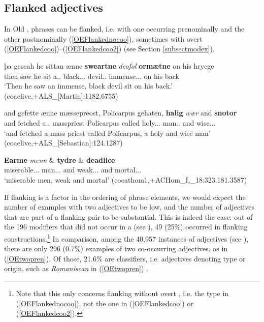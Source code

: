 \documentclass[output=paper,colorlinks,citecolor=brown,draft]{langscibook}
\begin{document}
\subsection{Flanked adjectives}\label{ssectFlanked}
\largerpage

In Old ,  phrases can be flanked, i.e. with one  occurring prenominally and the other postnominally (\ref{OEFlankednocoo}), sometimes with overt  (\ref{OEFlankedcoo})–(\ref{OEFlankedcoo2}) (see Section \ref{subsectmodex}).

\ea\label{OEFlankednocoo}
\gll þa geseah he sittan ænne \textbf{sweartne} \textit{deofol} \textbf{ormætne} on his hrycge\\
	then saw he sit a.\ACC.\SG{} black.\ACC.\SG.\STR{} devil.\ACC.\SG{} immense.\ACC.\SG.\STR{} on his back\\
\glt ‘Then he saw an immense, black devil sit on his back.’ (coaelive,+ALS\_[Martin]:1182.6755)
\z

\ea\label{OEFlankedcoo}
\gll and gefette ænne mæssepreost, Policarpus gehaten, \textbf{halig} \textit{wær} and \textbf{snotor}\\
	and fetched a.\ACC.\SG{} masspriest Policarpus called holy.\NOM.\SG.\STR{} man.\NOM.\SG{} and 	wise.\NOM.\SG.\STR{}\\
\glt ‘and fetched a mass priest called Policarpus, a holy and wise man’ (coaelive,+ALS\_[Sebastian]:124.1287)
\z

\ea\label{OEFlankedcoo2}
\gll \textbf{Earme} \textit{menn} \& \textbf{tydre} \& \textbf{deadlice}\\
	 miserable.\NOM.\PL.\STR{} man.\NOM.\PL.{} and weak.\NOM.\PL.\STR{} and mortal.\NOM.\PL.\STR{}\\
\glt ‘miserable men, weak and mortal’
(cocathom1,+ACHom\_I,\_18:323.181.3587)
\z


If flanking is a factor in the ordering of  phrase elements, we would expect the number of examples with two  adjectives to be low, and the number of  adjectives that are part of a flanking pair to be substantial. This is indeed the case: out of the 196  modifiers that did not occur in a   (see ), 49 (25\%) occurred in flanking constructions.\footnote{Note that this only concerns flanking without overt , i.e. the type in (\ref{OEFlankednocoo}), not the one in (\ref{OEFlankedcoo}) or (\ref{OEFlankedcoo2}).}  In comparison, among the 40,957 instances of  adjectives (see ), there are only 296 (0.7\%) examples of two co-occurring  adjectives, as in (\ref{OEtwopren}). Of those, 21.6\% are classifiers, i.e. adjectives denoting type or origin, such as \textit{Romaniscan} in (\ref{OEtwopren}) \citep[see][15]{Bech17}.
\end{document}

